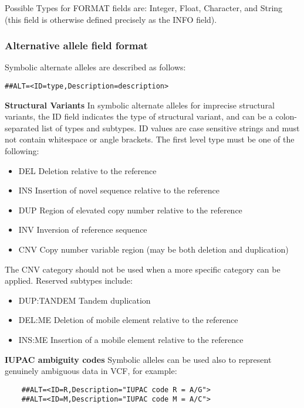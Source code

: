 \documentclass[8pt]{article}
\begin{document}
Possible Types for FORMAT fields are: Integer, Float, Character, and String (this field is otherwise defined precisely as the INFO field).

\subsubsection{Alternative allele field format}
Symbolic alternate alleles are described as follows:
\begin{verbatim}
##ALT=<ID=type,Description=description>
\end{verbatim}

\noindent \textbf{Structural Variants} \newline
In symbolic alternate alleles for imprecise structural variants,
the ID field indicates the type of structural variant, and can be a
colon-separated list of types and subtypes. ID values are case sensitive
strings and must not contain whitespace or angle brackets. The first level type
must be one of the following:
\begin{itemize}
  \item DEL Deletion relative to the reference
  \item INS Insertion of novel sequence relative to the reference
  \item DUP Region of elevated copy number relative to the reference
  \item INV Inversion of reference sequence
  \item CNV Copy number variable region (may be both deletion and duplication)
\end{itemize}

The CNV category should not be used when a more specific category can be applied. Reserved subtypes include:
\begin{itemize}
  \item DUP:TANDEM Tandem duplication
  \item DEL:ME Deletion of mobile element relative to the reference
  \item INS:ME Insertion of a mobile element relative to the reference
\end{itemize}

\bigskip

\noindent \textbf{IUPAC ambiguity codes} \newline
Symbolic alleles can be used also to represent genuinely ambiguous data in VCF, for example:
\begin{verbatim}
    ##ALT=<ID=R,Description="IUPAC code R = A/G">
    ##ALT=<ID=M,Description="IUPAC code M = A/C">
\end{verbatim}
\end{document}
